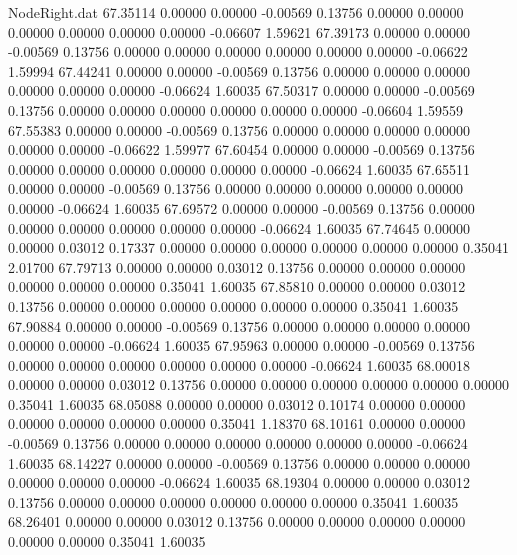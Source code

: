 \begin{filecontents}{NodeRight.dat}
  67.35114    0.00000    0.00000    -0.00569    0.13756    0.00000    0.00000    0.00000    0.00000    0.00000    0.00000   -0.06607    1.59621
  67.39173    0.00000    0.00000    -0.00569    0.13756    0.00000    0.00000    0.00000    0.00000    0.00000    0.00000   -0.06622    1.59994
  67.44241    0.00000    0.00000    -0.00569    0.13756    0.00000    0.00000    0.00000    0.00000    0.00000    0.00000   -0.06624    1.60035
  67.50317    0.00000    0.00000    -0.00569    0.13756    0.00000    0.00000    0.00000    0.00000    0.00000    0.00000   -0.06604    1.59559
  67.55383    0.00000    0.00000    -0.00569    0.13756    0.00000    0.00000    0.00000    0.00000    0.00000    0.00000   -0.06622    1.59977
  67.60454    0.00000    0.00000    -0.00569    0.13756    0.00000    0.00000    0.00000    0.00000    0.00000    0.00000   -0.06624    1.60035
  67.65511    0.00000    0.00000    -0.00569    0.13756    0.00000    0.00000    0.00000    0.00000    0.00000    0.00000   -0.06624    1.60035
  67.69572    0.00000    0.00000    -0.00569    0.13756    0.00000    0.00000    0.00000    0.00000    0.00000    0.00000   -0.06624    1.60035
  67.74645    0.00000    0.00000     0.03012    0.17337    0.00000    0.00000    0.00000    0.00000    0.00000    0.00000    0.35041    2.01700
  67.79713    0.00000    0.00000     0.03012    0.13756    0.00000    0.00000    0.00000    0.00000    0.00000    0.00000    0.35041    1.60035
  67.85810    0.00000    0.00000     0.03012    0.13756    0.00000    0.00000    0.00000    0.00000    0.00000    0.00000    0.35041    1.60035
  67.90884    0.00000    0.00000    -0.00569    0.13756    0.00000    0.00000    0.00000    0.00000    0.00000    0.00000   -0.06624    1.60035
  67.95963    0.00000    0.00000    -0.00569    0.13756    0.00000    0.00000    0.00000    0.00000    0.00000    0.00000   -0.06624    1.60035
  68.00018    0.00000    0.00000     0.03012    0.13756    0.00000    0.00000    0.00000    0.00000    0.00000    0.00000    0.35041    1.60035
  68.05088    0.00000    0.00000     0.03012    0.10174    0.00000    0.00000    0.00000    0.00000    0.00000    0.00000    0.35041    1.18370
  68.10161    0.00000    0.00000    -0.00569    0.13756    0.00000    0.00000    0.00000    0.00000    0.00000    0.00000   -0.06624    1.60035
  68.14227    0.00000    0.00000    -0.00569    0.13756    0.00000    0.00000    0.00000    0.00000    0.00000    0.00000   -0.06624    1.60035
  68.19304    0.00000    0.00000     0.03012    0.13756    0.00000    0.00000    0.00000    0.00000    0.00000    0.00000    0.35041    1.60035
  68.26401    0.00000    0.00000     0.03012    0.13756    0.00000    0.00000    0.00000    0.00000    0.00000    0.00000    0.35041    1.60035

\end{filecontents}

